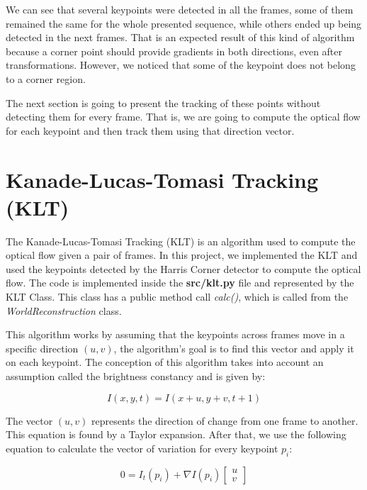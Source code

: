 \documentclass[]{IEEEtran}
\begin{document}
We can see that several keypoints were detected in all the frames, some of them remained the same for the whole presented sequence, while others ended up being detected in the next frames. That is an expected result of this kind of algorithm because a corner point should provide gradients in both directions, even after transformations. However, we noticed that some of the keypoint does not belong to a corner region.

The next section is going to present the tracking of these points without detecting them for every frame. That is, we are going to compute the optical flow for each keypoint and then track them using that direction vector.

\section{Kanade-Lucas-Tomasi Tracking (KLT)}
\label{sec:klt}

The Kanade-Lucas-Tomasi Tracking (KLT) is an algorithm used to compute the optical flow given a pair of frames. In this project, we implemented the KLT and used the keypoints detected by the Harris Corner detector to compute the optical flow. The code is implemented inside the \textbf{src/klt.py} file and represented by the KLT Class. This class has a public method call \textit{calc()}, which is called from the \textit{WorldReconstruction} class.

This algorithm works by assuming that the keypoints across frames move in a specific direction $(u, v)$, the algorithm's goal is to find this vector and apply it on each keypoint. The conception of this algorithm takes into account an assumption called the brightness constancy and is given by:

\begin{equation}
I(x, y, t) = I(x+u, y+v, t+1)
\end{equation}

The vector $(u, v)$ represents the direction of change from one frame to another. This equation is found by a Taylor expansion. After that, we use the following equation to calculate the vector of variation for every keypoint $p_i$:

\begin{equation}
0 = I_t(p_i) + \nabla I(p_i) 
\begin{bmatrix}
u \\ 
v
\end{bmatrix}
\end{equation}
\end{document}
